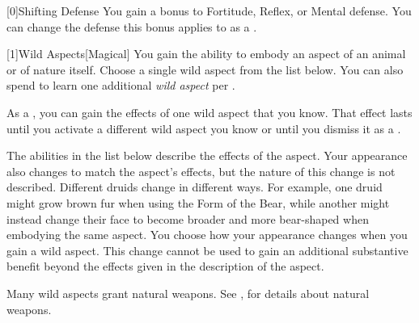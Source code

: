         [0]{Shifting Defense} You gain a  bonus to Fortitude, Reflex, or Mental defense.
        You can change the defense this bonus applies to as a .

        [1]{Wild Aspects}[Magical]
        You gain the ability to embody an aspect of an animal or of nature itself.
        Choose a single wild aspect from the list below.
        You can also spend  to learn one additional \textit{wild aspect} per .

        As a , you can gain the effects of one wild aspect that you know.
        That effect lasts until you activate a different wild aspect you know or until you dismiss it as a .

        The abilities in the list below describe the effects of the aspect.
        Your appearance also changes to match the aspect's effects, but the nature of this change is not described.
        Different druids change in different ways.
        For example, one druid might grow brown fur when using the Form of the Bear, while another might instead change their face to become broader and more bear-shaped when embodying the same aspect.
        You choose how your appearance changes when you gain a wild aspect.
        This change cannot be used to gain an additional substantive benefit beyond the effects given in the description of the aspect.

        Many wild aspects grant natural weapons.
        See , for details about natural weapons.

